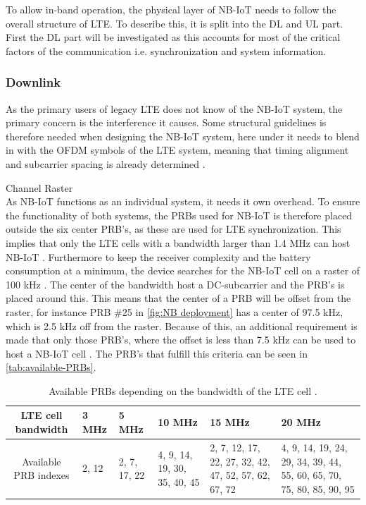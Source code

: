To allow in-band operation, the physical layer of \gls{NB-IoT} needs to follow the overall structure of \gls{LTE}. To describe this, it is split into the \gls{DL} and \gls{UL} part. First the \gls{DL} part will be investigated as this accounts for most of the critical factors of the communication i.e. synchronization and system information. 

\subsubsection{Downlink}
As the primary users of legacy \gls{LTE} does not know of the \gls{NB-IoT} system, the primary concern is the interference it causes. Some structural guidelines is therefore needed when designing the \gls{NB-IoT} system, here under it needs to blend in with the \gls{OFDM} symbols of the \gls{LTE} system, meaning that timing alignment and subcarrier spacing is already determined \citep[ch. 7.2]{NB-IoT_Book}. 

Channel Raster\\
As \gls{NB-IoT} functions as an individual system, it needs it own overhead. To ensure the functionality of both systems, the \gls{PRB}s used for \gls{NB-IoT} is therefore placed outside the six center \gls{PRB}'s, as these are used for LTE synchronization. This implies that only the LTE cells with a bandwidth larger than 1.4 MHz can host NB-IoT \citep{whitepaper}. Furthermore to keep the receiver complexity and the battery consumption at a minimum, the device searches for the \gls{NB-IoT} cell on a raster of 100 kHz \citep[ch. 7.2]{NB-IoT_Book}. The center of the bandwidth host a DC-subcarrier and the \gls{PRB}'s is placed around this. This means that the center of a PRB will be offset from the raster, for instance PRB \#25 in \autoref{fig:NB deployment} has a center of 97.5 kHz, which is 2.5 kHz off from the raster. Because of this, an additional requirement is made that only those \gls{PRB}'s, where the offset is less than 7.5 kHz can be used to host a NB-IoT cell \citep{primer}. The PRB's that fulfill this criteria can be seen in \autoref{tab:available-PRBs}. 

\begin{table}[H]
\centering
\begin{tabular}{|c|p{1.8cm}|p{1.8cm}|p{1.8cm}|p{1.8cm}|p{1.8cm}|}\hline
\textbf{LTE cell bandwidth}	& 3 MHz				& 5 MHz	& 10 MHz	& 15 MHz	& 20 MHz \\\hline
Available PRB indexes		& 2, 12	& 2, 7, 17, 22	& 4, 9, 14, 19, 30, 35, 40, 45 & 2, 7, 12, 17, 22, 27, 32, 42, 47, 52, 57, 62, 67, 72 & 4, 9, 14, 19, 24, 29, 34, 39, 44, 55, 60, 65, 70, 75, 80, 85, 90, 95 \\\hline
\end{tabular}
\caption{Available PRBs depending on the bandwidth of the LTE cell \citep{whitepaper}.}
\label{tab:available-PRBs}
\end{table}


